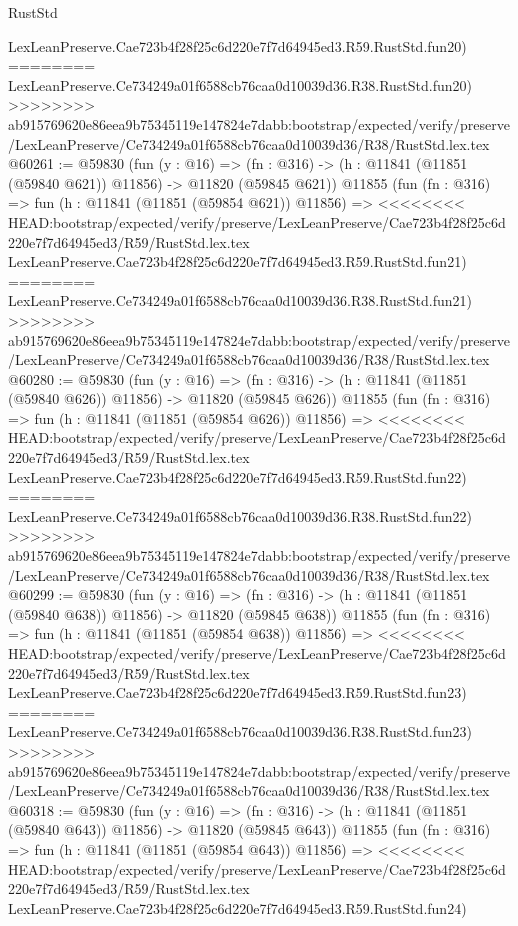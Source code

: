 \begin{lexlean}{RustStd}
\begin{coremodule}
{\begin{coremodule}
{{{{{{{{{{{{{{{{{{{{{{{{{{{{{{{{{{{{{{{{{{{{{{{{{{    LexLeanPreserve.Cae723b4f28f25c6d220e7f7d64945ed3.R59.RustStd.fun20)
========
    LexLeanPreserve.Ce734249a01f6588cb76caa0d10039d36.R38.RustStd.fun20)
>>>>>>>> ab915769620e86eea9b75345119e147824e7dabb:bootstrap/expected/verify/preserve/LexLeanPreserve/Ce734249a01f6588cb76caa0d10039d36/R38/RustStd.lex.tex
@60261 := @59830
    (fun (y : @16) =>
    (fn : @316) -> (h : @11841 (@11851 (@59840 @621)) @11856) -> @11820 (@59845 @621))
    @11855
    (fun (fn : @316) =>
    fun (h : @11841 (@11851 (@59854 @621)) @11856) =>
<<<<<<<< HEAD:bootstrap/expected/verify/preserve/LexLeanPreserve/Cae723b4f28f25c6d220e7f7d64945ed3/R59/RustStd.lex.tex
    LexLeanPreserve.Cae723b4f28f25c6d220e7f7d64945ed3.R59.RustStd.fun21)
========
    LexLeanPreserve.Ce734249a01f6588cb76caa0d10039d36.R38.RustStd.fun21)
>>>>>>>> ab915769620e86eea9b75345119e147824e7dabb:bootstrap/expected/verify/preserve/LexLeanPreserve/Ce734249a01f6588cb76caa0d10039d36/R38/RustStd.lex.tex
@60280 := @59830
    (fun (y : @16) =>
    (fn : @316) -> (h : @11841 (@11851 (@59840 @626)) @11856) -> @11820 (@59845 @626))
    @11855
    (fun (fn : @316) =>
    fun (h : @11841 (@11851 (@59854 @626)) @11856) =>
<<<<<<<< HEAD:bootstrap/expected/verify/preserve/LexLeanPreserve/Cae723b4f28f25c6d220e7f7d64945ed3/R59/RustStd.lex.tex
    LexLeanPreserve.Cae723b4f28f25c6d220e7f7d64945ed3.R59.RustStd.fun22)
========
    LexLeanPreserve.Ce734249a01f6588cb76caa0d10039d36.R38.RustStd.fun22)
>>>>>>>> ab915769620e86eea9b75345119e147824e7dabb:bootstrap/expected/verify/preserve/LexLeanPreserve/Ce734249a01f6588cb76caa0d10039d36/R38/RustStd.lex.tex
@60299 := @59830
    (fun (y : @16) =>
    (fn : @316) -> (h : @11841 (@11851 (@59840 @638)) @11856) -> @11820 (@59845 @638))
    @11855
    (fun (fn : @316) =>
    fun (h : @11841 (@11851 (@59854 @638)) @11856) =>
<<<<<<<< HEAD:bootstrap/expected/verify/preserve/LexLeanPreserve/Cae723b4f28f25c6d220e7f7d64945ed3/R59/RustStd.lex.tex
    LexLeanPreserve.Cae723b4f28f25c6d220e7f7d64945ed3.R59.RustStd.fun23)
========
    LexLeanPreserve.Ce734249a01f6588cb76caa0d10039d36.R38.RustStd.fun23)
>>>>>>>> ab915769620e86eea9b75345119e147824e7dabb:bootstrap/expected/verify/preserve/LexLeanPreserve/Ce734249a01f6588cb76caa0d10039d36/R38/RustStd.lex.tex
@60318 := @59830
    (fun (y : @16) =>
    (fn : @316) -> (h : @11841 (@11851 (@59840 @643)) @11856) -> @11820 (@59845 @643))
    @11855
    (fun (fn : @316) =>
    fun (h : @11841 (@11851 (@59854 @643)) @11856) =>
<<<<<<<< HEAD:bootstrap/expected/verify/preserve/LexLeanPreserve/Cae723b4f28f25c6d220e7f7d64945ed3/R59/RustStd.lex.tex
    LexLeanPreserve.Cae723b4f28f25c6d220e7f7d64945ed3.R59.RustStd.fun24)
}}}}}}}}}}}}}}}}}}}}}}}}}}}}}}}}}}}}}}}}}}}}}}}}}}
\end{coremodule}}
\end{coremodule}
\end{lexlean}
